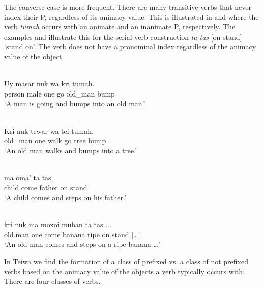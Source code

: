  

  

  

The converse case is more frequent. There are many transitive verbs that never index their P, regardless of its animacy value. This is illustrated in  and  where the verb \textit{tumah} occurs with an animate and an inanimate P, respectively. The examples  and  illustrate this for the serial verb construction \textit{ta tas} [on stand] `stand on'. The verb does not have a pronominal index regardless of the animacy value of the object.


\ea%
\label{bkm:Ref306281423}
 \\ 
\gll  Uy    masar  nuk  wa    kri  tumah. \\  
   person  male  one  go  old\_man  bump  \\
\glt  `A man is going and bumps into an old man.'
\z
 

\ea 
\label{ex:10:1243}
 \\ 
 \gll   Kri  nuk  tewar  wa  tei  tumah.\\
old\_man  one  walk  go  tree  bump   \\
 \glt `An old man walks and bumps into a tree.'
\z

 
 
\ea%
\label{bkm:Ref383697393}
 \\ 
  ma  oma'  ta  tas\\  
    child  come  father  on  stand \\
\glt `A child comes and steps on his father.'
\z

 
 

\ea%
\label{bkm:Ref383697402}
 \\ 
\gll   kri   nuk  ma  moxoi  muban  ta  tas  {\ob}...{\cb}\\  
   old.man  one  come  banana  ripe  on  stand  [{\dots}]  \\
\glt `An old man comes and steps on a ripe banana {\dots}'
\z

 
 

      

In Teiwa we find the formation of a class of prefixed vs. a class of not prefixed verbs based on the animacy value of the objects a verb typically occurs with. There are four classes of verbs.

